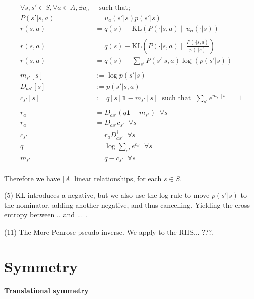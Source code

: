 \begin{align}
\forall s, s' \in S, \forall a \in A, \exists u_a& \;\;\text{such that;} \tag{1}\\
P(s' | s, a) &= u_a(s'|s)p(s'|s) \tag{2}\\
r(s, a) &= q(s) - \text{KL}(P(\cdot | s, a) \parallel u_a(\cdot| s) ) \tag{3}\\
\\
r(s, a) &= q(s) - \text{KL}(P(\cdot | s, a)\parallel\frac{P(\cdot | s, a)}{p(\cdot|s)}) \tag{4}\\
r(s, a) &= q(s) - \sum_{s'}P(s' | s, a) \log(p(s'|s)) \tag{5}\\
\\
m_{s'}[s]&:= \log p(s' | s) \tag{6}\\
D_{as'}[s] &:= p(s'|s, a) \tag{7}\\
c_{s'}[s] &:= q[s] \mathbf 1 - m_{s'}[s] \;\;\text{such that} \;\; \sum_{s'} e^{m_{s'}[s]} = 1 \tag{8}\\
\\
r_a &= D_{as'} ( q \mathbf 1 - m_{s'}) \;\;\forall s \tag{9}\\
r_a &= D_{as'}c_{s'}  \;\;\forall s \tag{10}\\
c_{s'} &= r_aD_{as'}^{\dagger} \;\;\forall s\tag{11}\\
q &= \log \sum_{s'} e^{c_{s'}} \;\;\forall s\tag{12}\\
m_{s'} &= q - c_{s'} \;\;\forall s\tag{14}\\
\end{align}


Therefore we have $|A|$ linear relationships, for each $s\in S$.

(5) KL introduces a negative, but we also use the log rule to move $p(s'|s)$ to the nominator, adding another negative, and thus cancelling. Yielding the cross entropy between .. and ... .

(11) The More-Penrose pseudo inverse. We apply to the RHS... ???.

\section{Symmetry}




\hypertarget{translational-symmetry}{%
\paragraph{Translational symmetry}\label{translational-symmetry}}

